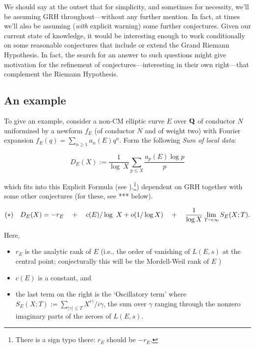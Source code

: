 \documentclass[11pt]{article}
\theoremstyle{plain}
\theoremstyle{definition}
\numberwithin{equation}{section}
\numberwithin{figure}{section}
\numberwithin{table}{section}
\def\Q{\bf{Q}}
\begin{document}
 We should say at the outset that for simplicity, and sometimes for necessity, we'll be assuming GRH throughout---without any further mention. In fact, at times we'll also be assuming ({\it with} explicit warning) some further conjectures. Given our current state of knowledge, it would be interesting enough to work  conditionally on some reasonable conjectures that include or extend the Grand Riemann Hypothesis.  In fact, the search for an answer to such questions  might give  motivation for the refinement of conjectures---interesting in their own right---that complement the Riemann Hypothesis.

\subsection{ An example}   To give an example, consider a non-CM elliptic curve $E$ over ${\Q}$ of conductor $N$  uniformized by a newform $f_E$ (of conductor $N$ and of weight two) with Fourier expansion  $f_E(q) = \sum_{n\ge 1}a_n(E)q^n$. Form the following {\it Sum of local data}:


    $${D}_E(X):= {\frac{1}{\log\ X}}\sum_{p \le X}{\frac{a_p(E)\log p}{ p}}$$

    which fits into this Explicit Formula (see \cite[Formula (vi) of the appendix]{S}).{\footnote{ There is a sign typo there: $r_E$ should be $-r_E$.}}) dependent on GRH together with some other conjectures
(for these, see *** below).

    $${\bf (*)}\ \ \ {D}_E(X) = -r_E \ \ \  +\ \ \  c(E)/\log\ X  +o(1/\log X)   \ \ \  +\ \ \
     {\frac{1}{\log X}}\lim_{T\to \infty}S_E(X;T).$$

     Here,

     \begin{itemize} \item   $r_E$ is the analytic rank of $E$  (i.e., the order of vanishing of  $L(E,s)$ at the central point; conjecturally this will be the Mordell-Weil rank of $E$ )\item $c(E)$ is a constant, and \item the last term  on the right is the `Oscillatory term' where  $S_E(X;T):=\sum_{|\gamma | \le T}X^{i\gamma}/i\gamma $, the sum over $\gamma$ ranging through the nonzero imaginary parts of the zeroes of $L(E,s) $.\end{itemize}
\end{document}
